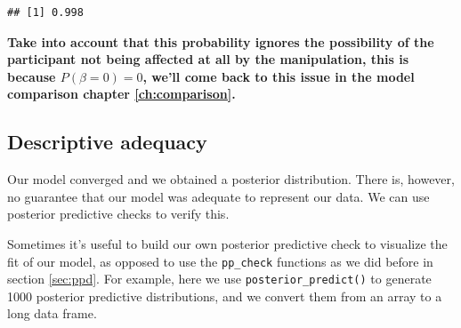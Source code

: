\documentclass[12pt,]{krantz}
\newenvironment{Shaded}{\begin{snugshade}}{\end{snugshade}}
\newcommand{\CommentTok}[1]{\textcolor[rgb]{0.56,0.35,0.01}{\textit{#1}}}
\newcommand{\ControlFlowTok}[1]{\textcolor[rgb]{0.13,0.29,0.53}{\textbf{#1}}}
\newcommand{\DataTypeTok}[1]{\textcolor[rgb]{0.13,0.29,0.53}{#1}}
\newcommand{\DecValTok}[1]{\textcolor[rgb]{0.00,0.00,0.81}{#1}}
\newcommand{\KeywordTok}[1]{\textcolor[rgb]{0.13,0.29,0.53}{\textbf{#1}}}
\newcommand{\NormalTok}[1]{#1}
\newcommand{\OperatorTok}[1]{\textcolor[rgb]{0.81,0.36,0.00}{\textbf{#1}}}
\newcommand{\StringTok}[1]{\textcolor[rgb]{0.31,0.60,0.02}{#1}}
\theoremstyle{definition}
\theoremstyle{definition}
\theoremstyle{definition}
\theoremstyle{remark}
\begin{document}
\begin{verbatim}
## [1] 0.998
\end{verbatim}

\textbf{Take into account that this probability ignores the possibility of the participant not being affected at all by the manipulation, this is because \(P(\beta=0)=0\), we'll come back to this issue in the model comparison chapter \ref{ch:comparison}.}

\hypertarget{sec:pupiladq}{%
\subsection{Descriptive adequacy}\label{sec:pupiladq}}

Our model converged and we obtained a posterior distribution. There is, however, no guarantee that our model was adequate to represent our data. We can use posterior predictive checks to verify this.

Sometimes it's useful to build our own posterior predictive check to visualize the fit of our model, as opposed to use the \texttt{pp\_check} functions as we did before in section \ref{sec:ppd}. For example, here we use \texttt{posterior\_predict()} to generate 1000 posterior predictive distributions, and we convert them from an array to a long data frame.

\begin{Shaded}
\end{Shaded}
\end{document}
